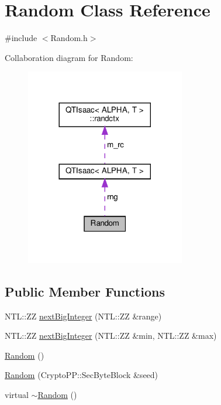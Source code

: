 \hypertarget{classRandom}{}\section{Random Class Reference}
\label{classRandom}


{\ttfamily \#include $<$Random.\+h$>$}



Collaboration diagram for Random\+:\nopagebreak
\begin{figure}[H]
\begin{center}
\leavevmode
\includegraphics[width=197pt]{classRandom__coll__graph}
\end{center}
\end{figure}
\subsection*{Public Member Functions}
\begin{DoxyCompactItemize}
\item 
N\+T\+L\+::\+ZZ \hyperlink{classRandom_a5347f94bb53028350ad9f46c375aae45}{next\+Big\+Integer} (N\+T\+L\+::\+ZZ \&range)
\item 
N\+T\+L\+::\+ZZ \hyperlink{classRandom_a1d267162c75edb3792dcf29f3125f265}{next\+Big\+Integer} (N\+T\+L\+::\+ZZ \&min, N\+T\+L\+::\+ZZ \&max)
\item 
\hyperlink{classRandom_acb76b49c3903a3c4fb67fd216341f08d}{Random} ()
\item 
\hyperlink{classRandom_a828e4af348ebff33c0785980a4ff4d38}{Random} (Crypto\+P\+P\+::\+Sec\+Byte\+Block \&seed)
\item 
virtual \hyperlink{classRandom_ac0d4eaf1f32df4600eb321cb8dbc0c55}{$\sim$\+Random} ()
\end{DoxyCompactItemize}
